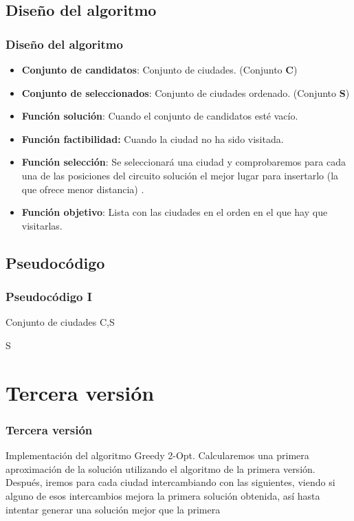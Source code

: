 \documentclass{beamer}
\begin{document}
\subsection{Diseño del algoritmo} 
\begin{frame}
	\frametitle{Diseño del algoritmo}
	\begin{itemize}
		\item \textbf{Conjunto de candidatos}: Conjunto de ciudades. (Conjunto \textbf{C})
		\item \textbf{Conjunto de seleccionados}: Conjunto de ciudades ordenado. (Conjunto \textbf{S})
		\item \textbf{Función solución}: Cuando el conjunto de candidatos esté vacío.
		\item \textbf{Función factibilidad:} Cuando la ciudad no ha sido visitada.
		\item \textbf{Función selección}: Se seleccionará una ciudad y comprobaremos para cada una de las posiciones del circuito solución el mejor lugar para insertarlo (la que ofrece menor distancia) .
		\item \textbf{Función objetivo}: Lista con las ciudades en el orden en el que hay que visitarlas.		
	\end{itemize}
	
\end{frame}

\subsection{Pseudocódigo}
\begin{frame}
	\frametitle{Pseudocódigo I}
			\begin{algorithmic}				
						\Require Conjunto de ciudades C,S
							\EndFor
						\EndFor  
						
						\Return S	
						
				
					
			\end{algorithmic}

	
\end{frame}


\section{Tercera versión} 
\begin{frame}
	\frametitle{Tercera versión}
	Implementación del algoritmo Greedy 2-Opt. Calcularemos una primera aproximación de la solución utilizando el algoritmo de la primera versión. Después, iremos para cada ciudad intercambiando con las siguientes, viendo si alguno de esos intercambios mejora la primera solución obtenida, así hasta intentar generar una solución mejor que la primera
\end{frame}
\end{document}
